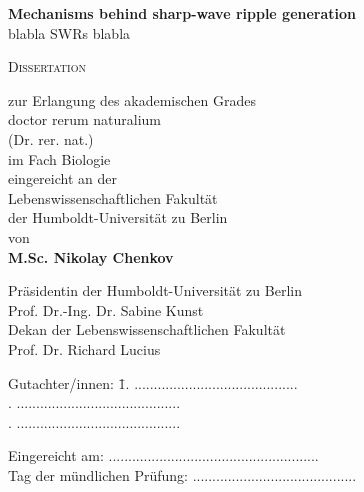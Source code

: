 \begin{titlepage}
\begin{center}
 \huge{\textbf{Mechanisms behind sharp-wave ripple generation\\}
 \vspace{5mm}
 {\LARGE blabla SWRs blabla}
 }
 

\vspace{1cm} \LARGE{\textsc{Dissertation}}
\end{center}

\begin{center}
  \vspace{1cm} \Large{zur Erlangung des akademischen Grades \\
            doctor rerum naturalium \\ 
            (Dr. rer. nat.) \\ 
            im Fach Biologie
          }
\vspace{1cm} \Large{\\ eingereicht an der \\
            Lebenswissenschaftlichen Fakult\"{a}t \\
            der Humboldt-Universit\"{a}t zu Berlin
          }
\vspace{0.5cm} \Large{ \\ von \\ 
            \textbf{M.Sc. Nikolay Chenkov}
          }

\end{center}
\vspace{2cm} Pr\"{a}sidentin der Humboldt-Universit\"{a}t zu Berlin \\
            Prof. Dr.-Ing. Dr. Sabine Kunst
\vspace{0.5cm} \\ Dekan der Lebenswissenschaftlichen Fakult\"{a}t \\
            Prof. Dr. Richard Lucius  \vspace{0.5cm} 


\begin{spacing}{2}
\begin{tabbing}
Gutachter/innen: \hspace{0,5cm} \=1. ..........................................\\
. ..........................................\\
. ..........................................
 \end{tabbing}
\vspace{0.2cm} 
Eingereicht am: ......................................................\\
Tag der mündlichen Prüfung: ..........................................

\end{spacing}	
\newpage
\end{titlepage}

